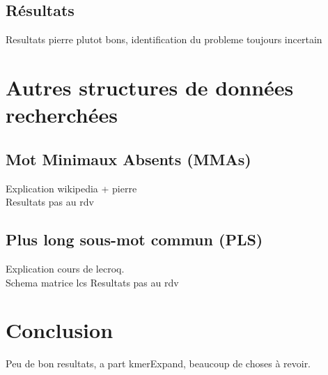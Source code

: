\documentclass{report}
\begin{document}
    \section{Résultats}
      Resultats pierre plutot bons, identification du probleme toujours incertain
    \newpage
  \chapter{Autres structures de données recherchées}
    \section{Mot Minimaux Absents (MMAs)}
      Explication wikipedia + pierre\\
      Resultats pas au rdv
    \section{Plus long sous-mot commun (PLS)}
      Explication cours de lecroq.\\
      Schema matrice lcs
      Resultats pas au rdv
    \newpage
  \chapter{Conclusion}
    Peu de bon resultats, a part kmerExpand, beaucoup de choses à revoir.
    \newpage
  
  
\end{document}
